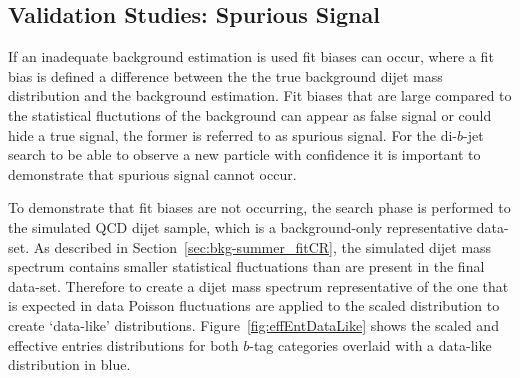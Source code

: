
\FloatBarrier
\subsection{Validation Studies: Spurious Signal}
\label{sec:bkg-summer_spusig}

If an inadequate background estimation is used fit biases can occur,
where a fit bias is defined a difference between the the true background
dijet mass distribution and the background estimation.
Fit biases that are large compared to the statistical fluctutions of the background
can appear as false signal or could hide a true signal, the former is referred to as spurious signal.
For the di-$b$-jet search to be able to observe a new particle with confidence it is
important to demonstrate that spurious signal cannot occur.

To demonstrate that fit biases are not occurring,
the search phase is performed to the simulated QCD dijet sample,
which is a background-only representative data-set. 
As described in Section~\ref{sec:bkg-summer_fitCR},
the simulated dijet mass spectrum contains smaller statistical fluctuations than are present in the final data-set.
Therefore to create a dijet mass spectrum representative of the one that is expected in data 
Poisson fluctuations are applied to the scaled distribution to create `data-like' distributions.
Figure~\ref{fig:effEntDataLike} shows the scaled and effective entries distributions for both
$b$-tag categories overlaid with a data-like distribution in blue.

